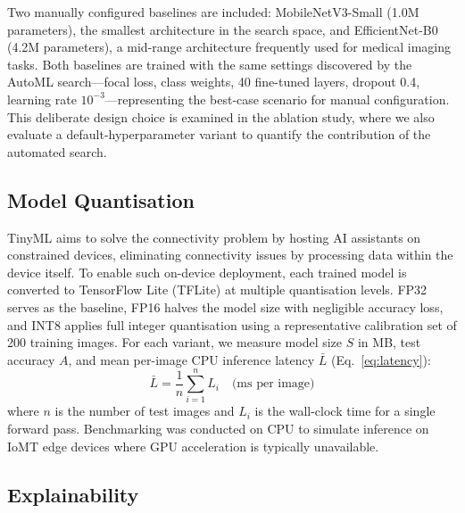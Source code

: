 \documentclass[conference]{IEEEtran}
\begin{document}
Two manually configured baselines are included: MobileNetV3-Small (1.0M parameters), the smallest architecture in the search space, and EfficientNet-B0 (4.2M parameters), a mid-range architecture frequently used for medical imaging tasks. Both baselines are trained with the same settings discovered by the AutoML search---focal loss, class weights, 40 fine-tuned layers, dropout 0.4, learning rate $10^{-3}$---representing the best-case scenario for manual configuration. This deliberate design choice is examined in the ablation study, where we also evaluate a default-hyperparameter variant to quantify the contribution of the automated search.
 
\subsection{Model Quantisation}
 
TinyML aims to solve the connectivity problem by hosting AI assistants on constrained devices, eliminating connectivity issues by processing data within the device itself. To enable such on-device deployment, each trained model is converted to TensorFlow Lite (TFLite) at multiple quantisation levels. FP32 serves as the baseline, FP16 halves the model size with negligible accuracy loss, and INT8 applies full integer quantisation using a representative calibration set of 200 training images. For each variant, we measure model size $S$ in MB, test accuracy $A$, and mean per-image CPU inference latency $\bar{L}$ (Eq.~\ref{eq:latency}):
\begin{equation}
\bar{L} = \frac{1}{n}\sum_{i=1}^{n} L_i \quad \text{(ms per image)}
\label{eq:latency}
\end{equation}
where $n$ is the number of test images and $L_i$ is the wall-clock time for a single forward pass. Benchmarking was conducted on CPU to simulate inference on IoMT edge devices where GPU acceleration is typically unavailable.
 
\subsection{Explainability}
 
\end{document}
